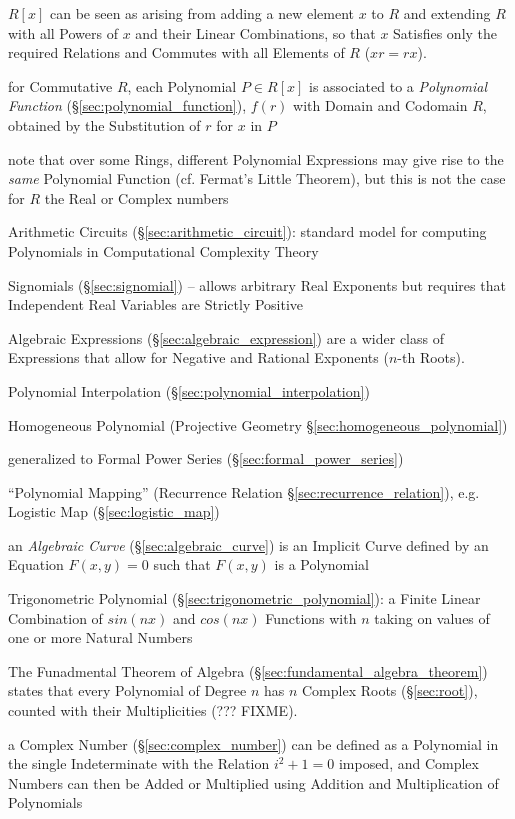 $R[x]$ can be seen as arising from adding a new element $x$ to $R$ and
extending $R$ with all Powers of $x$ and their Linear Combinations, so that $x$
Satisfies only the required Relations and Commutes with all Elements of $R$ ($xr
= rx$).

for Commutative $R$, each Polynomial $P \in R[x]$ is associated to a
\emph{Polynomial Function} (\S\ref{sec:polynomial_function}), $f(r)$ with Domain
and Codomain $R$, obtained by the Substitution of $r$ for $x$ in $P$

note that over some Rings, different Polynomial Expressions may give rise to the
\emph{same} Polynomial Function (cf. Fermat's Little Theorem), but this is not
the case for $R$ the Real or Complex numbers

\fist Arithmetic Circuits (\S\ref{sec:arithmetic_circuit}): standard model for
computing Polynomials in Computational Complexity Theory

\fist Signomials (\S\ref{sec:signomial}) -- allows arbitrary Real Exponents but
requires that Independent Real Variables are Strictly Positive

\fist Algebraic Expressions (\S\ref{sec:algebraic_expression}) are a wider
class of Expressions that allow for Negative and Rational Exponents ($n$-th
Roots).

\fist Polynomial Interpolation (\S\ref{sec:polynomial_interpolation})

\fist Homogeneous Polynomial (Projective Geometry
\S\ref{sec:homogeneous_polynomial})

\fist generalized to Formal Power Series (\S\ref{sec:formal_power_series})

\fist ``Polynomial Mapping'' (Recurrence Relation
\S\ref{sec:recurrence_relation}), e.g. Logistic Map (\S\ref{sec:logistic_map})

\fist an \emph{Algebraic Curve} (\S\ref{sec:algebraic_curve}) is an Implicit
Curve defined by an Equation $F(x,y) = 0$ such that $F(x,y)$ is a Polynomial

\fist Trigonometric Polynomial (\S\ref{sec:trigonometric_polynomial}): a Finite
Linear Combination of $sin(nx)$ and $cos(nx)$ Functions with $n$ taking on
values of one or more Natural Numbers

The Funadmental Theorem of Algebra (\S\ref{sec:fundamental_algebra_theorem})
states that every Polynomial of Degree $n$ has $n$ Complex Roots
(\S\ref{sec:root}), counted with their Multiplicities (??? FIXME).

a Complex Number (\S\ref{sec:complex_number}) can be defined as a Polynomial in
the single Indeterminate with the Relation $i^2 + 1 = 0$ imposed, and Complex
Numbers can then be Added or Multiplied using Addition and Multiplication of
Polynomials

